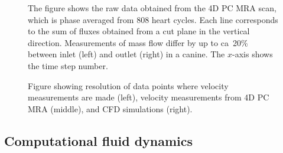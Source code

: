 \begin{figure}
  \begin{center}
  \end{center}
  \caption{The figure shows the raw data obtained from the 4D PC MRA scan,
which is phase averaged from 808 heart cycles. Each line corresponds to
the sum of fluxes obtained from a cut plane in the vertical direction.
Measurements of mass flow differ by up to ca~20\% between
inlet (left) and outlet (right) in a canine. The $x$-axis shows
the time step number.}
  \label{fig:kvs-2:mass_dog}
\end{figure}

\begin{figure}
  \begin{center}
  \end{center}
  \caption{Figure showing resolution of data points where velocity
    measurements are made (left), velocity measurements from 4D PC MRA
    (middle), and CFD simulations (right).}
  \label{fig:kvs-2:dog_mri}
\end{figure}

\subsection{Computational fluid dynamics}

